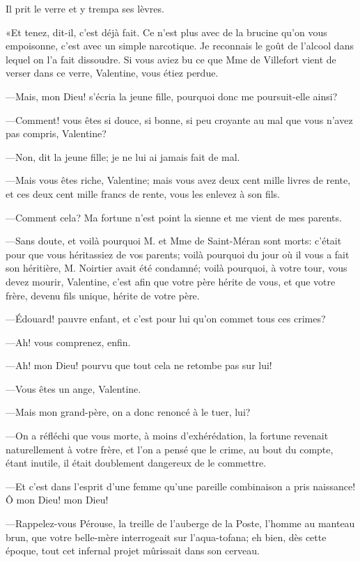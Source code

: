 Il prit le verre et y trempa ses lèvres. 

«Et tenez, dit-il, c'est déjà fait. Ce n'est plus avec de la brucine qu'on vous empoisonne, c'est avec un simple narcotique. Je reconnais le goût de l'alcool dans lequel on l'a fait dissoudre. Si vous aviez bu ce que Mme de Villefort vient de verser dans ce verre, Valentine, vous étiez perdue. 

—Mais, mon Dieu! s'écria la jeune fille, pourquoi donc me poursuit-elle ainsi? 

—Comment! vous êtes si douce, si bonne, si peu croyante au mal que vous n'avez pas compris, Valentine? 

—Non, dit la jeune fille; je ne lui ai jamais fait de mal. 

—Mais vous êtes riche, Valentine; mais vous avez deux cent mille livres de rente, et ces deux cent mille francs de rente, vous les enlevez à son fils. 

—Comment cela? Ma fortune n'est point la sienne et me vient de mes parents. 

—Sans doute, et voilà pourquoi M. et Mme de Saint-Méran sont morts: c'était pour que vous héritassiez de vos parents; voilà pourquoi du jour où il vous a fait son héritière, M. Noirtier avait été condamné; voilà pourquoi, à votre tour, vous devez mourir, Valentine, c'est afin que votre père hérite de vous, et que votre frère, devenu fils unique, hérite de votre père. 

—Édouard! pauvre enfant, et c'est pour lui qu'on commet tous ces crimes? 

—Ah! vous comprenez, enfin. 

—Ah! mon Dieu! pourvu que tout cela ne retombe pas sur lui! 

—Vous êtes un ange, Valentine. 

—Mais mon grand-père, on a donc renoncé à le tuer, lui? 

—On a réfléchi que vous morte, à moins d'exhérédation, la fortune revenait naturellement à votre frère, et l'on a pensé que le crime, au bout du compte, étant inutile, il était doublement dangereux de le commettre. 

—Et c'est dans l'esprit d'une femme qu'une pareille combinaison a pris naissance! Ô mon Dieu! mon Dieu! 

—Rappelez-vous Pérouse, la treille de l'auberge de la Poste, l'homme au manteau brun, que votre belle-mère interrogeait sur l'aqua-tofana; eh bien, dès cette époque, tout cet infernal projet mûrissait dans son cerveau. 

